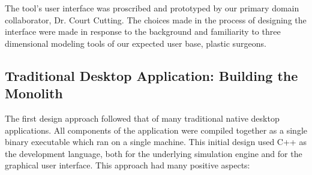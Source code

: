   The tool's user interface was proscribed and prototyped by our
  primary domain collaborator, Dr. Court Cutting. The choices made in
  the process of designing the interface were made in response to the
  background and familiarity to three dimensional modeling tools of
  our expected user base, plastic surgeons.  

  

\subsection{Traditional Desktop Application: Building the Monolith}

The first design approach followed that of many traditional native desktop
applications. All components of the application were compiled together
as a single binary executable which ran on a single machine. This
initial design used C++ as the development language, both for the
underlying simulation engine and for the graphical user
interface. This approach had many positive aspects:


